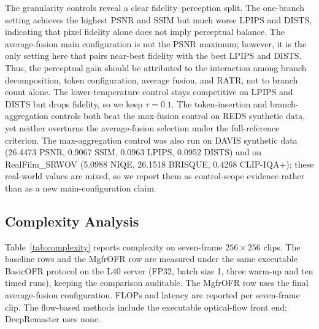 \documentclass[symmetry,article,submit,pdftex,moreauthors]{Definitions/mdpi}
\begin{document}
The granularity controls reveal a clear fidelity--perception split. The one-branch setting achieves the highest PSNR and SSIM but much worse LPIPS and DISTS, indicating that pixel fidelity alone does not imply perceptual balance. The average-fusion main configuration is not the PSNR maximum; however, it is the only setting here that pairs near-best fidelity with the best LPIPS and DISTS. Thus, the perceptual gain should be attributed to the interaction among branch decomposition, token configuration, average fusion, and RATR, not to branch count alone. The lower-temperature control stays competitive on LPIPS and DISTS but drops fidelity, so we keep $\tau=0.1$. The token-insertion and branch-aggregation controls both beat the max-fusion control on REDS synthetic data, yet neither overturns the average-fusion selection under the full-reference criterion. The max-aggregation control was also run on DAVIS synthetic data (26.4473 PSNR, 0.9067 SSIM, 0.0963 LPIPS, 0.0952 DISTS) and on RealFilm\_SRWOV (5.0988 NIQE, 26.1518 BRISQUE, 0.4268 CLIP-IQA+); these real-world values are mixed, so we report them as control-scope evidence rather than as a new main-configuration claim.

\FloatBarrier

\subsection{Complexity Analysis}
\label{subsec:complexity}

Table~\ref{tab:complexity} reports complexity on seven-frame $256{\times}256$ clips. The baseline rows and the MgfrOFR row are measured under the same executable BasicOFR protocol on the L40 server (FP32, batch size 1, three warm-up and ten timed runs), keeping the comparison auditable. The MgfrOFR row uses the final average-fusion configuration. FLOPs and latency are reported per seven-frame clip. The flow-based methods include the executable optical-flow front end; DeepRemaster uses none.
\end{document}
